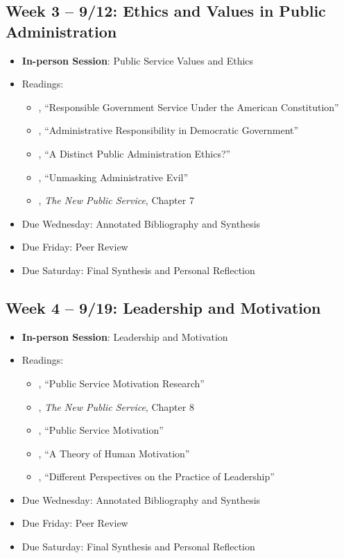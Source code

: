 \documentclass[12pt, letterpaper]{article}
\begin{document}
\subsection*{Week 3 -- 9/12: Ethics and Values in Public Administration}
\begin{itemize}
    \item \textbf{In-person Session}: Public Service Values and Ethics
    \item Readings:
        \begin{itemize}
            \item \citet{friedrich1935}, ``Responsible Government Service Under the American Constitution'' 
            \item \citet{FINER1941}, ``Administrative Responsibility in Democratic Government'' 
            \item \citet{goss1996}, ``A Distinct Public Administration Ethics?'' 
            \item \citet{Adams2009}, ``Unmasking Administrative Evil'' 
            \item \citet{Denhardt2015}, \emph{The New Public Service}, Chapter 7 
        \end{itemize}
        \item Due Wednesday: Annotated Bibliography and Synthesis
        \item Due Friday: Peer Review
        \item Due Saturday: Final Synthesis and Personal Reflection
\end{itemize}

\subsection*{Week 4 -- 9/19: Leadership and Motivation}
\begin{itemize}
    \item \textbf{In-person Session}: Leadership and Motivation
    \item Readings:
        \begin{itemize}
            \item \citet{Christensen2017}, ``Public Service Motivation Research'' 
            \item \citet{Denhardt2015}, \emph{The New Public Service}, Chapter 8 
            \item \citet{Lachance2017}, ``Public Service Motivation'' 
            \item \citet{maslow1943}, ``A Theory of Human Motivation'' 
            \item \citet{Fairholm2004}, ``Different Perspectives on the Practice of Leadership'' 
        \end{itemize}
        \item Due Wednesday: Annotated Bibliography and Synthesis
        \item Due Friday: Peer Review
        \item Due Saturday: Final Synthesis and Personal Reflection
\end{itemize}
\end{document}
